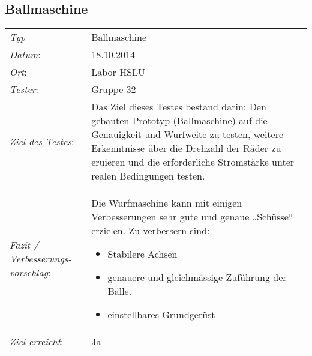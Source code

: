 \subsection{Ballmaschine}
\begin{tabular}{p{3.6cm}p{9.4cm}}
\textit{Typ}              & Ballmaschine \\ 
\textit{Datum}:           & 18.10.2014   \\
\textit{Ort}:             & Labor HSLU \\
\textit{Tester}:          & Gruppe 32 \\
\textit{Ziel des Testes}: & Das Ziel dieses Testes bestand darin: Den gebauten Prototyp (Ballmaschine) auf die Genauigkeit und Wurfweite zu testen, weitere Erkenntnisse über die Drehzahl der Räder zu eruieren und die erforderliche Stromstärke unter realen Bedingungen testen.  \\
\textit{Fazit / Verbesserungs-\newline vorschlag}: & Die Wurfmaschine kann mit einigen Verbesserungen sehr gute und genaue „Schüsse“ erzielen. Zu verbessern sind:
\begin{itemize}
    \item Stabilere Achsen
    \item genauere und gleichmässige Zuführung der Bälle.
    \item einstellbares Grundgerüst
\end{itemize}\\
\textit{Ziel erreicht}:& Ja\\
\end{tabular}
